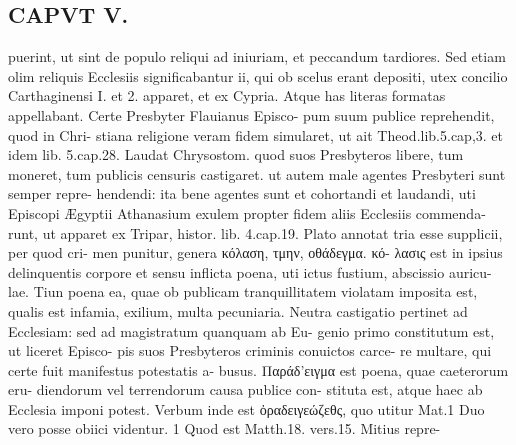 \documentclass{article}
\begin{document}
\begin{pages}
\section*{CAPVT  V. }
\marginpar{[ p.317 ]}puerint, ut sint de populo reliqui ad iniuriam, et peccandum tardiores. Sed etiam olim reliquis Ecclesiis significabantur ii, qui ob scelus erant depositi, utex concilio Carthaginensi I. et 2. apparet, et ex Cypria. Atque has literas formatas appellabant. Certe Presbyter Flauianus Episco- pum suum publice reprehendit, quod in Chri- stiana religione veram fidem simularet, ut ait Theod.lib.5.cap,3. et idem lib. 5.cap.28. Laudat Chrysostom. quod suos Presbyteros libere, tum moneret, tum publicis censuris castigaret. ut autem male agentes Presbyteri sunt semper repre- hendendi: ita bene agentes sunt et cohortandi et laudandi, uti Episcopi Ægyptii Athanasium exulem propter fidem aliis Ecclesiis commenda- runt, ut apparet ex Tripar, histor. lib. 4.cap.19. Plato annotat tria esse supplicii, per quod cri- men punitur, genera κόλαση, τμην, οθάδεγμα. κό- λασις est in ipsius delinquentis corpore et sensu inflicta poena, uti ictus fustium, abscissio auricu- lae. Tiun poena ea, quae ob publicam tranquillitatem violatam imposita est, qualis est infamia, exilium, multa pecuniaria. Neutra castigatio pertinet ad Ecclesiam: sed ad magistratum quanquam ab Eu- genio primo constitutum est, ut liceret Episco- pis suos Presbyteros criminis conuictos carce- re multare, qui certe fuit manifestus potestatis a- busus. Παράδ'ειγμα est poena, quae caeterorum eru- diendorum vel terrendorum causa publice con- stituta est, atque haec ab Ecclesia imponi potest. Verbum inde est ὀραδειγεώζεθς, quo utitur Mat.1 Duo vero posse obiici videntur. 1 Quod est Matth.18. vers.15. Mitius repre- 

\end{pages}
\end{document}
